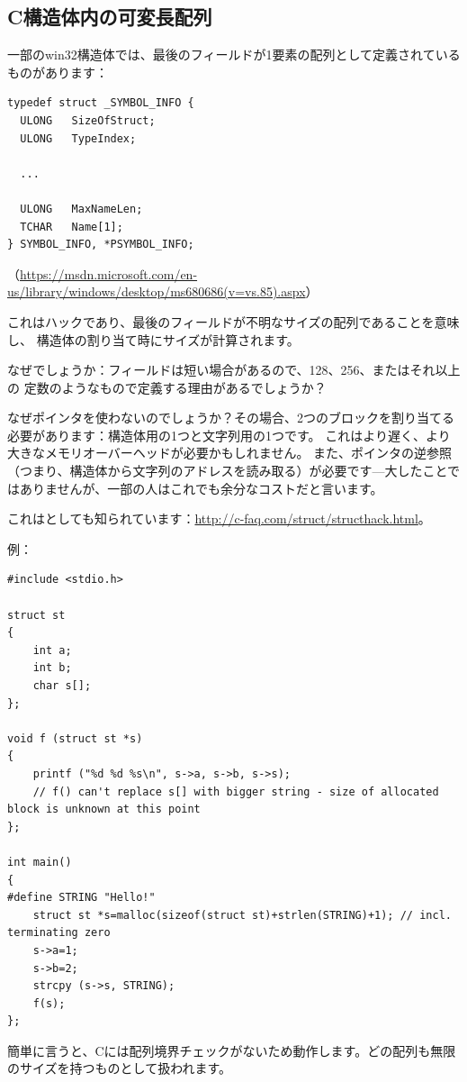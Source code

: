 \subsection{C構造体内の可変長配列}

一部のwin32構造体では、最後のフィールドが1要素の配列として定義されているものがあります：

\begin{lstlisting}[style=customc]
typedef struct _SYMBOL_INFO {
  ULONG   SizeOfStruct;
  ULONG   TypeIndex;
  
  ...

  ULONG   MaxNameLen;
  TCHAR   Name[1];
} SYMBOL_INFO, *PSYMBOL_INFO;
\end{lstlisting}

（\url{https://msdn.microsoft.com/en-us/library/windows/desktop/ms680686(v=vs.85).aspx}）

これはハックであり、最後のフィールドが不明なサイズの配列であることを意味し、
構造体の割り当て時にサイズが計算されます。

なぜでしょうか：フィールドは短い場合があるので、128、256、またはそれ以上の
定数のようなもので定義する理由があるでしょうか？

なぜポインタを使わないのでしょうか？その場合、2つのブロックを割り当てる必要があります：構造体用の1つと文字列用の1つです。
これはより遅く、より大きなメモリオーバーヘッドが必要かもしれません。
また、ポインタの逆参照（つまり、構造体から文字列のアドレスを読み取る）が必要です---大したことではありませんが、一部の人はこれでも余分なコストだと言います。

これはとしても知られています：\url{http://c-faq.com/struct/structhack.html}。

例：

\begin{lstlisting}[style=customc]
#include <stdio.h>

struct st
{
	int a;
	int b;
	char s[];
};

void f (struct st *s)
{
	printf ("%d %d %s\n", s->a, s->b, s->s);
	// f() can't replace s[] with bigger string - size of allocated block is unknown at this point
};

int main()
{
#define STRING "Hello!"
	struct st *s=malloc(sizeof(struct st)+strlen(STRING)+1); // incl. terminating zero
	s->a=1;
	s->b=2;
	strcpy (s->s, STRING);
	f(s);
};
\end{lstlisting}

簡単に言うと、Cには配列境界チェックがないため動作します。どの配列も無限のサイズを持つものとして扱われます。


